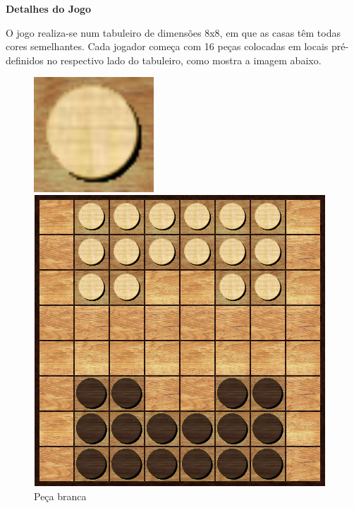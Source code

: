\documentclass[a4paper]{article}
\begin{document}
\large{\textbf{Detalhes do Jogo}}
\begin{small}

O jogo realiza-se num tabuleiro de dimensões 8x8, em que as casas têm todas cores semelhantes. Cada jogador começa com 16 peças colocadas em locais pré-definidos no respectivo lado do tabuleiro, como mostra a imagem abaixo.\newline

\begin{figure}[h!]
  \begin{minipage}[h!]{0.2\textwidth}
    \includegraphics[width=0.4\textwidth]{res/white_piece.png}
    \centering
    \caption{Peça branca}
    \label{fig:2}
  \end{minipage}
	\quad\quad\quad
  \begin{minipage}[h!]{0.2\textwidth}
    \includegraphics[width=\textwidth]{res/board.png}

\end{minipage}
\end{figure}
\end{small}
\end{document}
